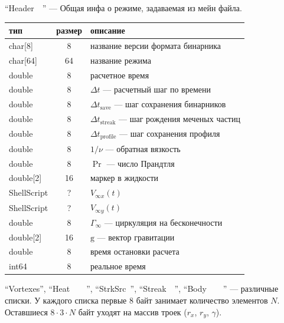 \documentclass[14pt]{extreport}
\newcommand{\br}[1]{\boldsymbol{\mathrm{#1}}}
\renewcommand{\vec}[1]{\br{#1}}
\begin{document}
``Header~~'' --- Общая инфа о режиме, задаваемая из мейн файла.\\
\begin{tabular}{lcl}
тип & размер & описание\\\hline
char[8]      & 8  & название версии формата бинарника\\
char[64]     & 64 & название режима\\
double       & 8  & расчетное время\\
double       & 8  & $\Delta t$ --- расчетный шаг по времени\\
double       & 8  & $\Delta t_\text{save}$ --- шаг сохранения бинарников\\
double       & 8  & $\Delta t_\text{streak}$ --- шаг рождения меченых частиц\\
double       & 8  & $\Delta t_\text{profile}$ --- шаг сохранения профиля\\
double       & 8  & $1/\nu$ --- обратная вязкость\\
double       & 8  & $\Pr$ --- число Прандтля\\
double[2]    & 16 & маркер в жидкости\\
ShellScript  & ?  & $V_{\infty x} (t)$\\
ShellScript  & ?  & $V_{\infty y} (t)$\\
double       & 8  & $\Gamma_\infty$ --- циркуляция на бесконечности\\
double[2]    & 16 & $\vec g$ --- вектор гравитации\\
double       & 8  & время остановки расчета\\
int64        & 8  & реальное время\\
\hline
\end{tabular}

``Vortexes'', ``Heat~~~~'', ``StrkSrc~'', ``Streak~~'', ``Body~~~~'' --- различные списки. У каждого списка первые 8 байт занимает количество элементов $N$. Оставшиеся $8\cdot 3 \cdot N$ байт уходят на массив троек ($r_x$, $r_y$, $\gamma$).
\end{document}
